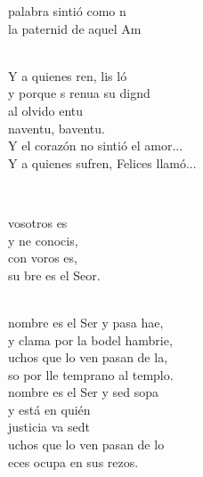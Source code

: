 \documentclass[12pt]{article}
\begin{document}
\begin{multicols*}{2}
\begin{cancion}
	palabra sintió como n  \\
	la paternid de aquel Am \\\jump\\
	\begin{chorus}%
	Y a quienes ren, lis ló \\
	y porque s renua su dignd\\
	al olvido entu\\
	naventu, baventu.  \\
Y el corazón no sintió el amor...\\
Y a quienes sufren, Felices llamó...\\
	\end{chorus}%
	\jump\\
\end{cancion}%

\begin{cancion}%
	\begin{chorus}%
	 vosotros es \\
	y ne conocis,\\
	con voros es, \\
	su bre es el Seor.\\
	\end{chorus}%
	\jump\\
	nombre es el Ser y pasa hae,\\
	y clama por la bodel hambrie,\\
	uchos que lo ven pasan de la,\\
	so por lle temprano al templo.\\
	nombre es el Ser y sed sopa\\
y está en quién \\
	justicia va sedt\\
	uchos que lo ven pasan de lo\\
	eces ocupa en sus rezos.\\
\end{cancion}%


\end{multicols*}
\end{document}
